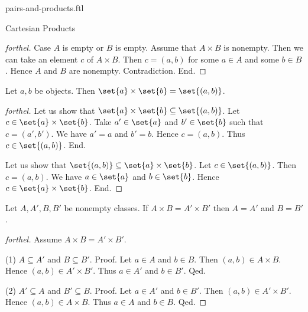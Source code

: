 \documentclass{naproche-library}
\begin{document}
\begin{smodule}[title=Ordered Pairs and Cartesian Products]{pairs-and-products.ftl}
\begin{sfragment}{Cartesian Products}
\begin{proof}[forthel]
    Case $A$ is empty or $B$ is empty.
      Assume that $A \times B$ is nonempty.
      Then we can take an element $c$ of $A \times B$.
      Then $c = (a, b)$ for some $a \in A$ and some $b \in B$.
      Hence $A$ and $B$ are nonempty.
      Contradiction.
    End.
  \end{proof}

  \begin{proposition}[forthel,id=FOUNDATIONS_04_7971087096741888]
    Let $a, b$ be objects.
    Then $\set{a} \times \set{b} = \set{(a, b)}$.
  \end{proposition}
  \begin{proof}[forthel]
    Let us show that $\set{a} \times \set{b} \subseteq \set{(a, b)}$.
      Let $c \in \set{a} \times \set{b}$.
      Take $a' \in \set{a}$ and $b' \in \set{b}$ such that $c = (a', b')$.
      We have $a' = a$ and $b' = b$.
      Hence $c = (a, b)$.
      Thus $c \in \set{(a, b)}$.
    End.

    Let us show that $\set{(a, b)} \subseteq \set{a} \times \set{b}$.
      Let $c \in \set{(a, b)}$.
      Then $c = (a, b)$.
      We have $a \in \set{a}$ and $b \in \set{b}$.
      Hence $c \in \set{a} \times \set{b}$.
    End.
  \end{proof}

  \begin{proposition}[forthel,id=FOUNDATIONS_04_7456594440749056]
    Let $A, A', B, B'$ be nonempty classes.
    If $A \times B = A' \times B'$ then $A = A'$ and $B = B'$.
  \end{proposition}
  \begin{proof}[forthel]
    Assume $A \times B = A' \times B'$.

    (1) $A \subseteq A'$ and $B \subseteq B'$. \newline
    Proof.
      Let $a \in A$ and $b \in B$.
      Then $(a,b) \in A \times B$.
      Hence $(a,b) \in A' \times B'$.
      Thus $a \in A'$ and $b \in B'$.
    Qed.

    (2) $A' \subseteq A$ and $B' \subseteq B$. \newline
    Proof.
      Let $a \in A'$ and $b \in B'$.
      Then $(a,b) \in A' \times B'$.
      Hence $(a,b) \in A \times B$.
      Thus $a \in A$ and $b \in B$.
    Qed.
  \end{proof}
\end{sfragment}
\end{smodule}
\end{document}
